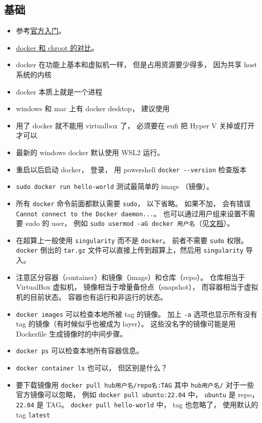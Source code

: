 \subsection{基础}
\begin{itemize}
\item 参考\href{https://docs.docker.com/get-started/}{官方入门}。
\item \href{https://devops.stackexchange.com/questions/2826/difference-between-chroot-and-docker}{docker 和 chroot 的对比}。
\item docker 在功能上基本和虚拟机一样， 但是占用资源要少得多， 因为共享 host 系统的内核
\item docker 本质上就是一个进程
\item windows 和 mac 上有 docker desktop， 建议使用
\item 用了 docker 就不能用 virtualbox 了， 必须要在 eufi 把 Hyper V 关掉或打开才可以
\item 最新的 windows docker 默认使用 WSL2 运行。
\item 重启以后启动 docker， 登录， 用 powershell \verb`docker --version` 检查版本
\item \verb`sudo docker run hello-world` 测试最简单的 image （镜像）。
\item 所有 \verb|docker| 命令前面都默认需要 \verb|sudo|， 以下省略。 如果不加， 会有错误 \verb|Cannot connect to the Docker daemon...|。 也可以通过用户组来设置不需要 sudo 的 user， 例如 \verb|sudo usermod -aG docker 用户名|（见\href{https://docs.docker.com/engine/install/linux-postinstall/}{文档}）。
\item 在超算上一般使用 \verb|singularity| 而不是 \verb|docker|。 前者不需要 \verb|sudo| 权限。 \verb|docker| 倒出的 \verb|tar.gz| 文件可以直接上传到超算上，然后用 \verb|singularity| 导入。
\item 注意区分容器（container）和镜像（image）和仓库（repo）。 仓库相当于 VirtualBox 虚拟机， 镜像相当于增量备份点（snapshot）， 而容器相当于虚拟机的目前状态。 容器也有运行和非运行的状态。
\item \verb`docker images` 可以检查本地所被 tag 的镜像。 加上 \verb|-a| 选项也显示所有没有 tag 的镜像（有时候似乎也被成为 layer）。 这些没名字的镜像可能是用 Dockerfile 生成镜像时的中间步骤。
\item \verb`docker ps` 可以检查本地所有容器信息。
\item \verb|docker container ls| 也可以， 但区别是什么？
\item 要下载镜像用 \verb`docker pull hub用户名/repo名:TAG` 其中 \verb|hub用户名/| 对于一些官方镜像可以忽略， 例如 \verb`docker pull ubuntu:22.04` 中， \verb|ubuntu| 是 repo， \verb|22.04| 是 TAG。 \verb|docker pull hello-world| 中， tag 也忽略了， 使用默认的 tag \verb|latest|

\end{itemize}
